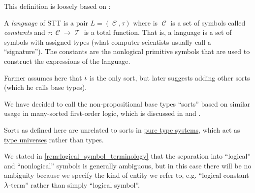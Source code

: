 \begin{comments}
  \item This definition is loosely based on :
  \begin{displayquote}
    A \textit{language} of STT is a pair \( L = (\mscrC, \tau) \) where is \( \mscrC \) is a set of symbols called \textit{constants} and \( \tau: \mscrC \to \mscrT \) is a total function. That is, a language is a set of symbols with assigned types (what computer scientists usually call a \enquote{signature}). The constants are the nonlogical primitive symbols that are used to construct the expressions of the language.
  \end{displayquote}

  Farmer assumes here that \( \dot{\iota} \) is the only sort, but later suggests adding other sorts (which he calls base types).

  We have decided to call the non-propositional base types \enquote{sorts} based on similar usage in many-sorted first-order logic, which is discussed in \cite[\S 4.4.13]{TroelstraSchwichtenberg2000BasicProofTheory} and \cite[def. 62]{GoguenBurstall1992Institutions}.

  \item Sorts as defined here are unrelated to sorts in \hyperref[def:pure_type_system]{pure type systems}, which act as \hyperref[con:type_universe]{type universes} rather than types.

  \item We stated in \cref{rem:logical_symbol_terminology} that the separation into \enquote{logical} and \enquote{nonlogical} symbols is generally ambiguous, but in this case there will be no ambiguity because we specify the kind of entity we refer to, e.g. \enquote{logical constant \( {\mathrm \lambda} \)-term} rather than simply \enquote{logical symbol}.
\end{comments}

